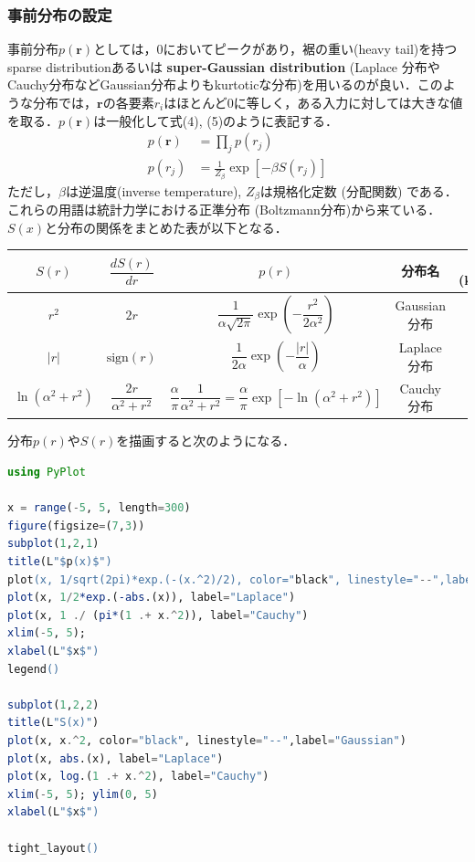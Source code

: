 \subsubsection{事前分布の設定}
事前分布$p(\mathbf{r})$としては，0においてピークがあり，裾の重い(heavy tail)を持つsparse distributionあるいは \textbf{super-Gaussian distribution} (Laplace 分布やCauchy分布などGaussian分布よりもkurtoticな分布)を用いるのが良い．このような分布では，$\mathbf{r}$の各要素$r_i$はほとんど0に等しく，ある入力に対しては大きな値を取る．$p(\mathbf{r})$は一般化して式(4), (5)のように表記する．
\begin{align}
p(\mathbf{r})&=\prod_j p(r_j)\\
p(r_j)&=\frac{1}{Z_{\beta}}\exp \left[-\beta S(r_j)\right]
\end{align}
ただし，$\beta$は逆温度(inverse temperature), $Z_{\beta}$は規格化定数 (分配関数) である．これらの用語は統計力学における正準分布 (Boltzmann分布)から来ている．$S(x)$と分布の関係をまとめた表が以下となる．
\begin{table}[h]
\centering
\begin{tabular}{ccccc}
\hline
$S(r)$ & $\dfrac{dS(r)}{dr}$ & $p(r)$ & 分布名 & 尖度(kurtosis) \\
\hline
$r^2$ & $2r$ & $\dfrac{1}{\alpha \sqrt{2\pi}}\exp\left(-\dfrac{r^2}{2\alpha^2}\right)$ & Gaussian 分布 & 0 \\
$\vert r\vert$ & $\text{sign}(r)$ & $\dfrac{1}{2\alpha}\exp\left(-\dfrac{\vert r\vert}{\alpha}\right)$ & Laplace 分布 & 3.0 \\
$\ln (\alpha^2+r^2)$ & $\dfrac{2r}{\alpha^2+r^2}$ & $\dfrac{\alpha}{\pi}\dfrac{1}{\alpha^2+r^2}=\dfrac{\alpha}{\pi}\exp[-\ln (\alpha^2+r^2)]$ & Cauchy 分布 & - \\
\hline
\end{tabular}
\end{table}
分布$p(r)$や$S(r)$を描画すると次のようになる．
\begin{lstlisting}[language=julia]
using PyPlot

x = range(-5, 5, length=300)
figure(figsize=(7,3))
subplot(1,2,1)
title(L"$p(x)$")
plot(x, 1/sqrt(2pi)*exp.(-(x.^2)/2), color="black", linestyle="--",label="Gaussian")
plot(x, 1/2*exp.(-abs.(x)), label="Laplace")
plot(x, 1 ./ (pi*(1 .+ x.^2)), label="Cauchy")
xlim(-5, 5); 
xlabel(L"$x$")
legend()

subplot(1,2,2)
title(L"S(x)")
plot(x, x.^2, color="black", linestyle="--",label="Gaussian")
plot(x, abs.(x), label="Laplace")
plot(x, log.(1 .+ x.^2), label="Cauchy")
xlim(-5, 5); ylim(0, 5)
xlabel(L"$x$")

tight_layout()
\end{lstlisting}
